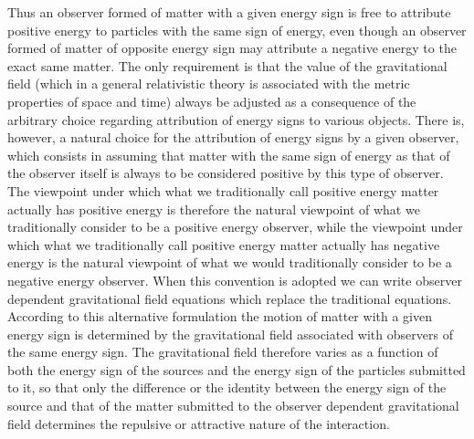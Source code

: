 \documentclass[notitlepage,12pt]{report}
\begin{document}
Thus an observer formed of matter with a given energy sign is free to attribute positive energy to particles with the same sign of energy, even though an observer formed of matter of opposite energy sign may attribute a negative energy to the exact same matter. The only requirement is that the value of the gravitational field (which in a general relativistic theory is associated with the metric properties of space and time) always be adjusted as a consequence of the arbitrary choice regarding attribution of energy signs to various objects. There is, however, a natural choice for the attribution of energy signs by a given observer, which consists in assuming that matter with the same sign of energy as that of the observer itself is always to be considered positive by this type of observer. The viewpoint under which what we traditionally call positive energy matter actually has positive energy is therefore the natural viewpoint of what we traditionally consider to be a positive energy observer, while the viewpoint under which what we traditionally call positive energy matter actually has negative energy is the natural viewpoint of what we would traditionally consider to be a negative energy observer. When this convention is adopted we can write observer dependent gravitational field equations which replace the traditional equations. According to this alternative formulation the motion of matter with a given energy sign is determined by the gravitational field associated with observers of the same energy sign. The gravitational field therefore varies as a function of both the energy sign of the sources and the energy sign of the particles submitted to it, so that only the difference or the identity between the energy sign of the source and that of the matter submitted to the observer dependent gravitational field determines the repulsive or attractive nature of the interaction.
\end{document}

